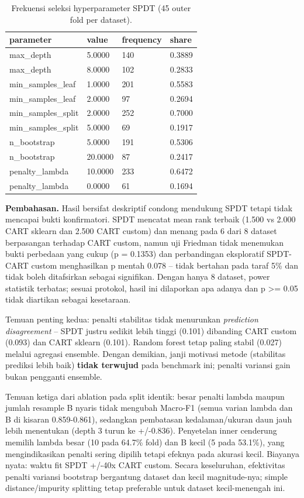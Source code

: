 \documentclass[
  conference]{IEEEtran}
\begin{document}
\begin{table}[!tb]
\centering
\caption{Frekuensi seleksi hyperparameter SPDT (45 outer fold per dataset).}
\begin{tabular}{@{}llll@{}}
\toprule\noalign{}
parameter & value & frequency & share \\
\midrule\noalign{}
\bottomrule\noalign{}
max\_depth & 5.0000 & 140 & 0.3889 \\
max\_depth & 8.0000 & 102 & 0.2833 \\
min\_samples\_leaf & 1.0000 & 201 & 0.5583 \\
min\_samples\_leaf & 2.0000 & 97 & 0.2694 \\
min\_samples\_split & 2.0000 & 252 & 0.7000 \\
min\_samples\_split & 5.0000 & 69 & 0.1917 \\
n\_bootstrap & 5.0000 & 191 & 0.5306 \\
n\_bootstrap & 20.0000 & 87 & 0.2417 \\
penalty\_lambda & 10.0000 & 233 & 0.6472 \\
penalty\_lambda & 0.0000 & 61 & 0.1694 \\
\end{tabular}
\end{table}

\textbf{Pembahasan.} Hasil bersifat deskriptif condong mendukung SPDT
tetapi tidak mencapai bukti konfirmatori. SPDT mencatat mean rank
terbaik (1.500 vs 2.000 CART sklearn dan 2.500 CART custom) dan menang
pada 6 dari 8 dataset berpasangan terhadap CART custom, namun uji
Friedman tidak menemukan bukti perbedaan yang cukup (p = 0.1353) dan
perbandingan eksploratif SPDT-CART custom menghasilkan p mentah 0.078 --
tidak bertahan pada taraf 5\% dan tidak boleh ditafsirkan sebagai
signifikan. Dengan hanya 8 dataset, power statistik terbatas; sesuai
protokol, hasil ini dilaporkan apa adanya dan p \textgreater= 0.05 tidak
diartikan sebagai kesetaraan.

Temuan penting kedua: penalti stabilitas tidak menurunkan
\emph{prediction disagreement} -- SPDT justru sedikit lebih tinggi
(0.101) dibanding CART custom (0.093) dan CART sklearn (0.101). Random
forest tetap paling stabil (0.027) melalui agregasi ensemble. Dengan
demikian, janji motivasi metode (stabilitas prediksi lebih baik)
\textbf{tidak terwujud} pada benchmark ini; penalti variansi gain bukan
pengganti ensemble.

Temuan ketiga dari ablation pada split identik: besar penalti lambda
maupun jumlah resample B nyaris tidak mengubah Macro-F1 (semua varian
lambda dan B di kisaran 0.859-0.861), sedangkan pembatasan
kedalaman/ukuran daun jauh lebih menentukan (depth 3 turun ke +/-0.836).
Penyetelan inner cenderung memilih lambda besar (10 pada 64.7\% fold)
dan B kecil (5 pada 53.1\%), yang mengindikasikan penalti sering dipilih
tetapi efeknya pada akurasi kecil. Biayanya nyata: waktu fit SPDT +/-40x
CART custom. Secara keseluruhan, efektivitas penalti variansi bootstrap
bergantung dataset dan kecil magnitude-nya; simple distance/impurity
splitting tetap preferable untuk dataset kecil-menengah ini.
\end{document}

